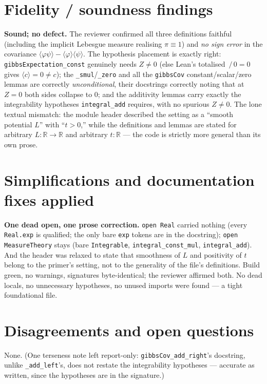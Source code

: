 \documentclass[11pt]{article}
\begin{document}
\section{Fidelity / soundness findings}
\textbf{Sound; no defect.} The reviewer confirmed all three definitions faithful (including the
implicit Lebesgue measure realising $\pi\equiv 1$) and \emph{no sign error} in the covariance
$\langle\varphi\psi\rangle-\langle\varphi\rangle\langle\psi\rangle$. The hypothesis placement is
exactly right: \texttt{gibbsExpectation\_const} genuinely needs $Z\ne 0$ (else Lean's totalised
$\,/\,0=0$ gives $\langle c\rangle=0\ne c$); the \texttt{\_smul}/\texttt{\_zero} and all the
\texttt{gibbsCov} constant/scalar/zero lemmas are correctly \emph{unconditional}, their docstrings
correctly noting that at $Z=0$ both sides collapse to $0$; and the additivity lemmas carry exactly the
integrability hypotheses \texttt{integral\_add} requires, with no spurious $Z\ne 0$. The lone textual
mismatch: the module header described the setting as a ``smooth potential $L$'' with ``$t>0$,'' while
the definitions and lemmas are stated for arbitrary $L:\mathbb R\to\mathbb R$ and arbitrary
$t:\mathbb R$ --- the code is strictly more general than its own prose.

\section{Simplifications and documentation fixes applied}
\textbf{One dead open, one prose correction.} \texttt{open Real} carried nothing (every
\texttt{Real.exp} is qualified; the only bare \texttt{exp} tokens are in the docstring);
\texttt{open MeasureTheory} stays (bare \texttt{Integrable}, \texttt{integral\_const\_mul},
\texttt{integral\_add}). And the header was relaxed to state that smoothness of $L$ and positivity of
$t$ belong to the primer's setting, not to the generality of the file's definitions. Build green, no
warnings, signatures byte-identical; the reviewer affirmed both. No dead locals, no unnecessary
hypotheses, no unused imports were found --- a tight foundational file.

\section{Disagreements and open questions}
None. (One terseness note left report-only: \texttt{gibbsCov\_add\_right}'s docstring, unlike
\texttt{\_add\_left}'s, does not restate the integrability hypotheses --- accurate as written, since
the hypotheses are in the signature.)
\end{document}

